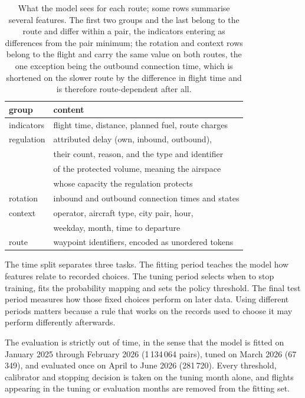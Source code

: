 \documentclass[conference,10pt,a4paper,IEEEoverridecommandlockouts]{IEEEtran}
\begin{document}
\begin{table}[t]
\caption{What the model sees for each route; some rows summarise several
features. The first two groups and the last belong to
the route and differ within a pair, the indicators entering as differences
from the pair minimum; the rotation and context rows belong to the flight
and carry the same value on both routes, the one exception being the
outbound connection time, which is shortened on the slower route by the
difference in flight time and is therefore route-dependent after all.}
\label{tab:features} \centering\footnotesize
\begin{tabular}{ll}
\toprule
group & content \\
\midrule
indicators & flight time, distance, planned fuel, route charges \\
regulation & attributed delay (own, inbound, outbound), \\ & their
count, reason, and the type and identifier \\ & of the protected
volume, meaning the airspace \\ & whose capacity the regulation
protects \\
rotation   & inbound and outbound connection times and states \\
context    & operator, aircraft type, city pair, hour, \\
           & weekday, month, time to departure \\
route      & waypoint identifiers, encoded as unordered tokens \\
\bottomrule
\end{tabular}
\end{table}

The time split separates three tasks. The fitting period teaches the
model how features relate to recorded choices. The tuning period selects
when to stop training, fits the probability mapping and sets the policy
threshold. The final test period measures how those fixed choices perform
on later data. Using different periods matters because a rule that works
on the records used to choose it may perform differently afterwards.

The evaluation is strictly out of time, in the sense that the model is
fitted on January 2025 through February 2026 (1\,134\,064 pairs), tuned on
March 2026 (67\,349), and evaluated once on April to June 2026
(281\,720). Every threshold, calibrator and stopping decision is taken on
the tuning month alone, and flights appearing in the tuning or evaluation
months are removed from the fitting set.
\end{document}
